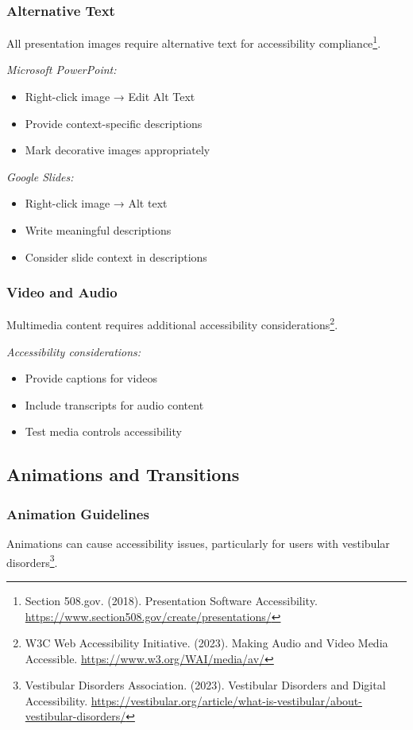 \subsubsection{Alternative Text}
All presentation images require alternative text for accessibility compliance\footnote{Section 508.gov. (2018). Presentation Software Accessibility. \url{https://www.section508.gov/create/presentations/}}.

\emph{Microsoft PowerPoint:}
\begin{itemize}
\item Right-click image → Edit Alt Text
\item Provide context-specific descriptions
\item Mark decorative images appropriately
\end{itemize}

\emph{Google Slides:}
\begin{itemize}
\item Right-click image → Alt text
\item Write meaningful descriptions
\item Consider slide context in descriptions
\end{itemize}

\subsubsection{Video and Audio}
Multimedia content requires additional accessibility considerations\footnote{W3C Web Accessibility Initiative. (2023). Making Audio and Video Media Accessible. \url{https://www.w3.org/WAI/media/av/}}.

\emph{Accessibility considerations:}
\begin{itemize}
\item Provide captions for videos
\item Include transcripts for audio content
\item Test media controls accessibility
\end{itemize}

\subsection{Animations and Transitions}

\subsubsection{Animation Guidelines}
Animations can cause accessibility issues, particularly for users with vestibular disorders\footnote{Vestibular Disorders Association. (2023). Vestibular Disorders and Digital Accessibility. \url{https://vestibular.org/article/what-is-vestibular/about-vestibular-disorders/}}.


